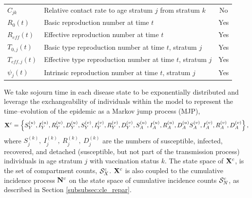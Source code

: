 \begin{table}[htbp]
\begin{tabular}{llc}
		$ C_{jk} $ & Relative contact rate to age stratum $ j $ from stratum $ k $ & No\\
		$ R_0(t) $ &  Basic reproduction number at time $ t $ & Yes \\
		$ R_{eff}(t) $ & Effective reproduction number at time $ t $ & Yes \\
		$ T_{0,j}(t) $ & Basic type reproduction number at time $ t $, stratum $ j $ & Yes \\
		$ T_{eff,j}(t) $ & Effective type reproduction number at time $ t $, stratum $ j $ & Yes \\
		$ \psi_j(t) $ & Intrinsic reproduction number at time $ t $, stratum $ j $ & Yes\\
		\hline
	\end{tabular}
\end{table}

We take sojourn time in each disease state to be exponentially distributed and leverage the exchangeability of individuals within the model to represent the time--evolution of the epidemic as a Markov jump process (MJP), $$ \mathbf{X}^c = \left \lbrace S_{Y}^{(u)}, I_{Y}^{(u)}, R_{Y}^{(u)},D_Y^{(u)},
S_{Y}^{(v)}, I_{Y}^{(v)}, R_{Y}^{(v)},D_Y^{(v)}, S_{A}^{(u)}, I_{A}^{(u)}, R_{A}^{(u)},D_A^{(u)}
S_{A}^{(v)}, I_{A}^{(v)}, R_{A}^{(v)},D_A^{(v)} \right \rbrace, $$ where $ S_j^{(k)},\ I_j^{(k)},\ R_j^{(k)},\ D_j^{(k)} $ are the numbers of susceptible, infected, recovered, and detached (susceptible, but not part of the transmission process) individuals in age stratum $ j $ with vaccination status $ k $. The state space of $ \mathbf{X}^c $, is the set of compartment counts, $ \mathcal{S}_X^c$. $ \mathbf{X}^c $ is also coupled to the cumulative incidence process $ \mathbf{N}^c $ on the state space of cumulative incidence counts $ \mathcal{S}_N^c $, as described in Section \ref{subsubsec:cle_repar}.

